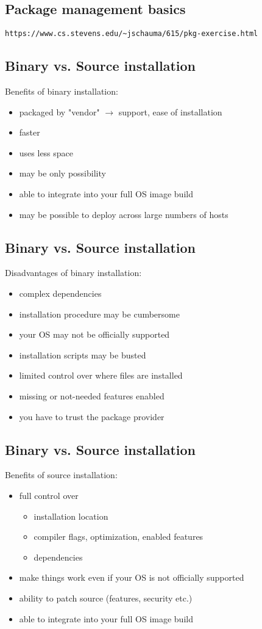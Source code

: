 \documentclass[xga]{xdvislides}
\begin{document}
\subsection{Package management basics}
\vfill
{\tt https://www.cs.stevens.edu/\~{}jschauma/615/pkg-exercise.html}
\vfill

\subsection{Binary vs. Source installation}
Benefits of binary installation:
\begin{itemize}
	\item packaged by "vendor" $\rightarrow$ support, ease of installation
	\item faster
	\item uses less space
	\item may be only possibility
	\item able to integrate into your full OS image build
	\item may be possible to deploy across large numbers of hosts
\end{itemize}

\subsection{Binary vs. Source installation}
Disadvantages of binary installation:
\begin{itemize}
	\item complex dependencies
	\item installation procedure may be cumbersome
	\item your OS may not be officially supported
	\item installation scripts may be busted
	\item limited control over where files are installed
	\item missing or not-needed features enabled
	\item you have to trust the package provider
\end{itemize}

\subsection{Binary vs. Source installation}
Benefits of source installation:
\begin{itemize}
	\item full control over
		\begin{itemize}
			\item installation location
			\item compiler flags, optimization, enabled features
			\item dependencies
		\end{itemize}
	\item make things work even if your OS is not officially supported
	\item ability to patch source (features, security etc.)
	\item able to integrate into your full OS image build
\end{itemize}
\end{document}
